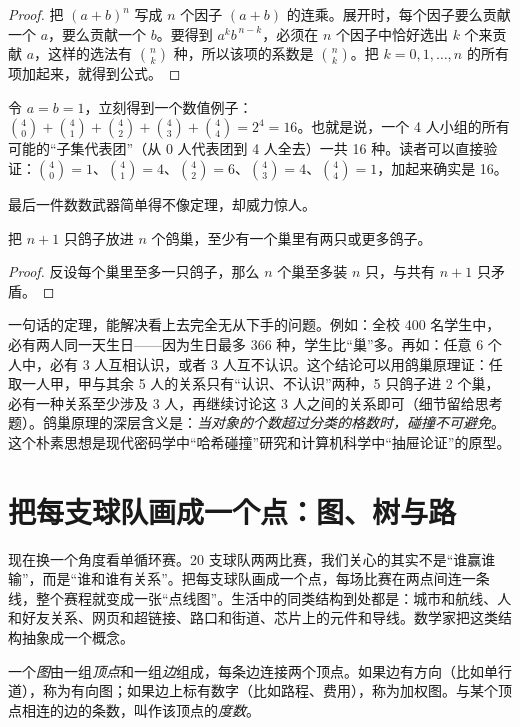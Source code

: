 \begin{proof}
把 $(a+b)^n$ 写成 $n$ 个因子 $(a+b)$ 的连乘。展开时，每个因子要么贡献一个 $a$，要么贡献一个 $b$。要得到 $a^k b^{\,n-k}$，必须在 $n$ 个因子中恰好选出 $k$ 个来贡献 $a$，这样的选法有 $\binom{n}{k}$ 种，所以该项的系数是 $\binom{n}{k}$。把 $k=0,1,\dots,n$ 的所有项加起来，就得到公式。
\end{proof}

令 $a=b=1$，立刻得到一个数值例子：$\binom{4}{0}+\binom{4}{1}+\binom{4}{2}+\binom{4}{3}+\binom{4}{4}=2^4=16$。也就是说，一个 4 人小组的所有可能的“子集代表团”（从 0 人代表团到 4 人全去）一共 16 种。读者可以直接验证：$\binom{4}{0}=1$、$\binom{4}{1}=4$、$\binom{4}{2}=6$、$\binom{4}{3}=4$、$\binom{4}{4}=1$，加起来确实是 16。

最后一件数数武器简单得不像定理，却威力惊人。

\begin{dingli}[鸽巢原理]
把 $n+1$ 只鸽子放进 $n$ 个鸽巢，至少有一个巢里有两只或更多鸽子。
\end{dingli}

\begin{proof}
反设每个巢里至多一只鸽子，那么 $n$ 个巢至多装 $n$ 只，与共有 $n+1$ 只矛盾。
\end{proof}

一句话的定理，能解决看上去完全无从下手的问题。例如：全校 400 名学生中，必有两人同一天生日——因为生日最多 366 种，学生比“巢”多。再如：任意 6 个人中，必有 3 人互相认识，或者 3 人互不认识。这个结论可以用鸽巢原理证：任取一人甲，甲与其余 5 人的关系只有“认识、不认识”两种，5 只鸽子进 2 个巢，必有一种关系至少涉及 3 人，再继续讨论这 3 人之间的关系即可（细节留给思考题）。鸽巢原理的深层含义是：\emph{当对象的个数超过分类的格数时，碰撞不可避免}。这个朴素思想是现代密码学中“哈希碰撞”研究和计算机科学中“抽屉论证”的原型。

\section{把每支球队画成一个点：图、树与路}

现在换一个角度看单循环赛。20 支球队两两比赛，我们关心的其实不是“谁赢谁输”，而是“谁和谁有关系”。把每支球队画成一个点，每场比赛在两点间连一条线，整个赛程就变成一张“点线图”。生活中的同类结构到处都是：城市和航线、人和好友关系、网页和超链接、路口和街道、芯片上的元件和导线。数学家把这类结构抽象成一个概念。

\begin{dingyi}[图]
一个\emph{图}由一组\emph{顶点}和一组\emph{边}组成，每条边连接两个顶点。如果边有方向（比如单行道），称为有向图；如果边上标有数字（比如路程、费用），称为加权图。与某个顶点相连的边的条数，叫作该顶点的\emph{度数}。
\end{dingyi}

